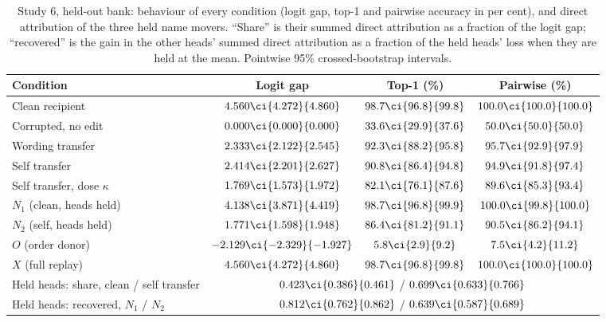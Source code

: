 \begin{table}[htbp]
\centering\small
\caption{Study 6, held-out bank: behaviour of every condition (logit gap, top-1 and pairwise accuracy in per cent), and direct attribution of the three held name movers. ``Share'' is their summed direct attribution as a fraction of the logit gap; ``recovered'' is the gain in the other heads' summed direct attribution as a fraction of the held heads' loss when they are held at the mean. Pointwise 95\% crossed-bootstrap intervals.}
\label{tab:positive-control-behaviour}
\footnotesize\setlength{\tabcolsep}{4pt}
\begin{tabular}{@{}lccc@{}}
\toprule
Condition & Logit gap & Top-1 (\%) & Pairwise (\%) \\
\midrule
Clean recipient & $4.560\ci{4.272}{4.860}$ & $98.7\ci{96.8}{99.8}$ & $100.0\ci{100.0}{100.0}$ \\
Corrupted, no edit & $0.000\ci{0.000}{0.000}$ & $33.6\ci{29.9}{37.6}$ & $50.0\ci{50.0}{50.0}$ \\
Wording transfer & $2.333\ci{2.122}{2.545}$ & $92.3\ci{88.2}{95.8}$ & $95.7\ci{92.9}{97.9}$ \\
Self transfer & $2.414\ci{2.201}{2.627}$ & $90.8\ci{86.4}{94.8}$ & $94.9\ci{91.8}{97.4}$ \\
Self transfer, dose $\kappa$ & $1.769\ci{1.573}{1.972}$ & $82.1\ci{76.1}{87.6}$ & $89.6\ci{85.3}{93.4}$ \\
$N_1$ (clean, heads held) & $4.138\ci{3.871}{4.419}$ & $98.7\ci{96.8}{99.9}$ & $100.0\ci{99.8}{100.0}$ \\
$N_2$ (self, heads held) & $1.771\ci{1.598}{1.948}$ & $86.4\ci{81.2}{91.1}$ & $90.5\ci{86.2}{94.1}$ \\
$O$ (order donor) & $-2.129\ci{-2.329}{-1.927}$ & $5.8\ci{2.9}{9.2}$ & $7.5\ci{4.2}{11.2}$ \\
$X$ (full replay) & $4.560\ci{4.272}{4.860}$ & $98.7\ci{96.8}{99.8}$ & $100.0\ci{100.0}{100.0}$ \\
\addlinespace
Held heads: share, clean / self transfer & \multicolumn{3}{c}{$0.423\ci{0.386}{0.461}$ / $0.699\ci{0.633}{0.766}$} \\
Held heads: recovered, $N_1$ / $N_2$ & \multicolumn{3}{c}{$0.812\ci{0.762}{0.862}$ / $0.639\ci{0.587}{0.689}$} \\
\bottomrule
\end{tabular}
\end{table}

